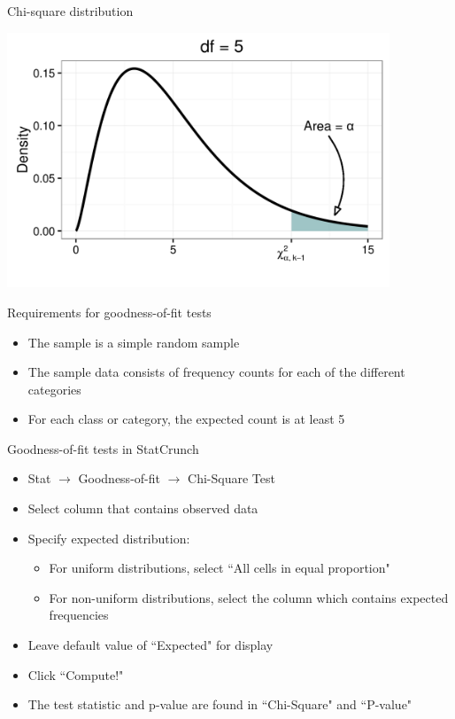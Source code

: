 \documentclass[xcolor=table]{beamer}
\begin{document}
\begin{frame}{Chi-square distribution}
\bigskip
{\centering
\includegraphics[width=4.5in]{../images/ch11_chi_square_crit}
\par}
\end{frame}



\begin{frame}{Requirements for goodness-of-fit tests}
\begin{block}{}
\large
\begin{itemize}
\item The sample is a simple random sample
\pause\item The sample data consists of frequency counts for each of the different categories
\pause\item For each class or category, the expected count is at least 5 
\end{itemize}
\end{block}
\end{frame}


\begin{frame}{Goodness-of-fit tests in StatCrunch}

\begin{block}{}
\large
\begin{itemize}
\item Stat $\to$ Goodness-of-fit $\to$ Chi-Square Test
\item Select column that contains observed data
\item Specify expected distribution:
\begin{itemize}
\item For uniform distributions, select ``All cells in equal proportion"
\item For non-uniform distributions, select the column which contains expected frequencies
\end{itemize}
\item Leave default value of ``Expected" for display
\item Click ``Compute!"
\item The test statistic and p-value are found in ``Chi-Square" and ``P-value"
\end{itemize}
\end{block}
\end{frame}
\end{document}
